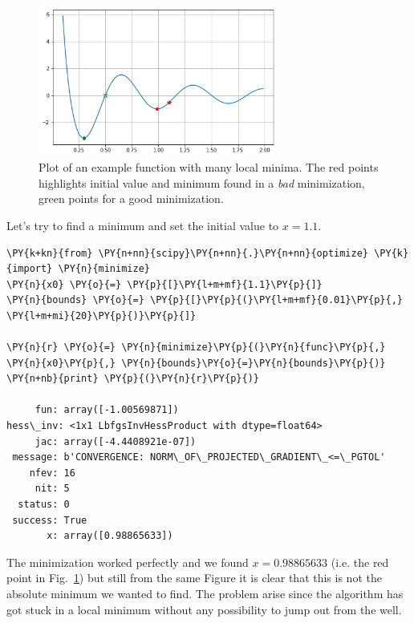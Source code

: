 \begin{figure}[htb]
	\centering
	\includegraphics[width=0.7\textwidth]{figures/local_minima.png}
	\caption{Plot of an example function with many local minima. The red points highlights initial value and minimum found in a \emph{bad} minimization, green points for a good minimization.}
	\label{fig:local_minima}
\end{figure}

Let's try to find a minimum and set the initial value to $x=1.1$.
\begin{tcolorbox}[breakable, size=fbox, boxrule=1pt, pad at break*=1mm,colback=cellbackground, colframe=cellborder]
\begin{Verbatim}[commandchars=\\\{\}]
\PY{k+kn}{from} \PY{n+nn}{scipy}\PY{n+nn}{.}\PY{n+nn}{optimize} \PY{k}{import} \PY{n}{minimize}
\PY{n}{x0} \PY{o}{=} \PY{p}{[}\PY{l+m+mf}{1.1}\PY{p}{]}
\PY{n}{bounds} \PY{o}{=} \PY{p}{[}\PY{p}{(}\PY{l+m+mf}{0.01}\PY{p}{,} \PY{l+m+mi}{20}\PY{p}{)}\PY{p}{]}
		
\PY{n}{r} \PY{o}{=} \PY{n}{minimize}\PY{p}{(}\PY{n}{func}\PY{p}{,} \PY{n}{x0}\PY{p}{,} \PY{n}{bounds}\PY{o}{=}\PY{n}{bounds}\PY{p}{)}
\PY{n+nb}{print} \PY{p}{(}\PY{n}{r}\PY{p}{)}

     fun: array([-1.00569871])
hess\_inv: <1x1 LbfgsInvHessProduct with dtype=float64>
     jac: array([-4.4408921e-07])
 message: b'CONVERGENCE: NORM\_OF\_PROJECTED\_GRADIENT\_<=\_PGTOL'
    nfev: 16
     nit: 5
  status: 0
 success: True
       x: array([0.98865633])
\end{Verbatim}
\end{tcolorbox}
The minimization worked perfectly and we found $x=0.98865633$ (i.e. the red point in Fig.~\ref{fig:local_minima}) but still from the same Figure it is clear that this is not the absolute minimum we wanted to find. The problem arise since the algorithm has got stuck in a local minimum without any possibility to jump out from the well.

